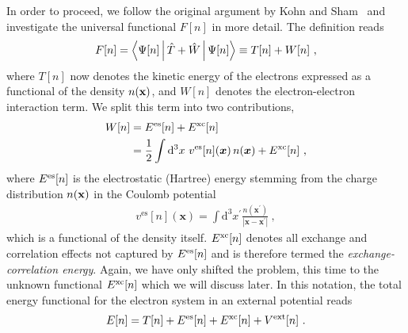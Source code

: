 In order to proceed, we follow the original argument by Kohn and Sham~\cite{Kohn1965} and investigate the universal functional $F[n]$ in more detail. The definition reads
\begin{align}
	F[n] 
		= \Braket{\Psi [n] | \hat T + \hat W | \Psi [n]}
		\equiv T[n] + W[n]~,
	\label{eq:dft.Fn.2}
\end{align}
where $T[n]$ now denotes the kinetic energy of the electrons expressed as a functional of the density $n ({\bf x})$, and $W[n]$ denotes the electron-electron interaction term. We split this term into two contributions,
\begin{align}
	\begin{split}
	W[n] 
		&= E^{\rm es} [n] + E^{\rm xc} [n] \\
		&= \frac{1}{2} \int \mathrm{d}^{3} x ~ 
			v^{\mathrm{es}}[n](\boldsymbol{x}) \, n(\boldsymbol{x})+E^{\mathrm{xc}}[n]~,
	\end{split}
	\label{eq:dft.KS.W}
\end{align}
where $E^{\rm es} [n]$ is the electrostatic (Hartree) energy stemming from the charge distribution $n ({\bf x})$ in the Coulomb potential
\begin{align}
	v^{\mathrm{es}}[n](\boldsymbol{x})
		= \int \mathrm{d}^{3} x^{\prime} \frac{n\left(\boldsymbol{x}^{\prime}\right)}{\left|\boldsymbol{x}-\boldsymbol{x}^{\prime}\right|}~,
	\label{eq:dft.KS.ves}
\end{align}
which is a functional of the density itself. $E^{\rm xc} [n]$ denotes all exchange and correlation effects not captured by $E^{\rm es} [n]$ and is therefore termed the \emph{exchange-correlation energy}. Again, we have only shifted the problem, this time to the unknown functional $E^{\rm xc} [n]$ which we will discuss later.
In this notation, the total energy functional for the electron system in an external potential reads
\begin{align}
	E[n]
		= T[n] +  E^{\rm es}[n] + E^{\rm xc} [n] + V^{\rm ext}[n]~.
	\label{eq:dft.Ks.En}
\end{align}

